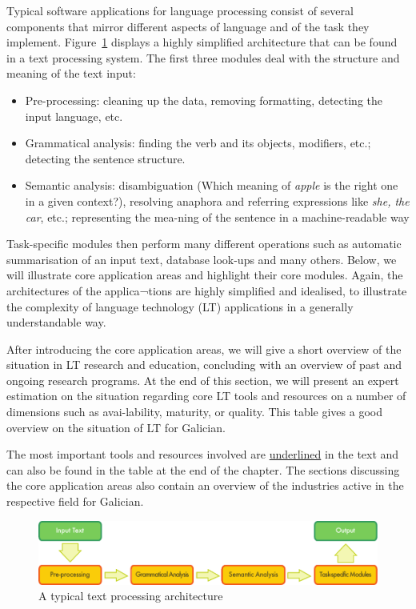 \begin{multicols}{2}
\begin{itemize}
\begin{multicols}{2}
Typical software applications for language processing consist of several components that mirror different aspects of language and of the task they implement. Figure~\ref{fig:textprocessingarch_en} displays a highly simplified architecture that can be found in a text processing system. The first three modules deal with the structure and meaning of the text input:
    \begin{itemize}
      \item Pre-processing: cleaning up the data, removing formatting, detecting the input language, etc. 
      \item Grammatical analysis: finding the verb and its objects, modifiers, etc.; detecting the sentence structure.
      \item Semantic analysis: disambiguation (Which meaning of \textit{apple} is the right one in a given context?), resolving anaphora and referring expressions like \textit{she, the car}, etc.; representing the mea-ning of the sentence in a machine-readable way
\end{itemize}

 Task-specific modules then perform many different operations such as automatic summarisation of an input text, database look-ups and many others. Below, we will illustrate core application areas and highlight their core modules. Again, the architectures of the applica¬tions are highly simplified and idealised, to illustrate the complexity of language technology (LT) applications in a generally understandable way. 

After introducing the core application areas, we will give a short overview of the situation in LT research and education, concluding with an overview of past and ongoing research programs. At the end of this section, we will present an expert estimation on the situation regarding core LT tools and resources on a number of dimensions such as avai-lability, maturity, or quality. This table gives a good overview on the situation of LT for Galician.

The most important tools and resources involved are \uline{underlined} in the text and can also be found in the table at the end of the chapter.  The sections discussing the core application areas also contain an overview of the industries active in the respective field for Galician. 


\begin{figure}[b]
  \center
  \includegraphics[width=\textwidth]{../_media/english/text_processing_app_architecture}
  \caption{A typical text processing architecture}
  \label{fig:textprocessingarch_en}
\end{figure}




\end{multicols}
\end{itemize}
\end{multicols}
